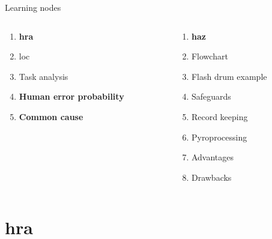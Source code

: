 \documentclass[aspectratio=1610,pdftex,dvipsnames,compress,xcolor={dvipsnames}]{beamer}
\newcommand{\acf}{\acrfull} %
\newcommand{\acl}{\acrlong} %
\newcommand{\acs}{\acrshort} %
\begin{document}
\begin{frame}{Learning nodes}
    \begin{columns}[t]

        \begin{column}{0.50\textwidth}
            \begin{enumerate}[series=outerlist,topsep=0pt,itemsep=1pt,leftmargin=*,label=(\arabic*)]
                \item[]\textbf{\acl{hra}}
                \item[]\acs{loc}
                \item[]Task analysis
                    \vspace{0.25in}
                \item[]\textbf{Human error probability}
                    \vspace{0.25in}
                \item[]\textbf{Common cause}
            \end{enumerate}
        \end{column}

        \begin{column}{0.50\textwidth}
            \begin{enumerate}[series=outerlist,topsep=0pt,itemsep=1pt,leftmargin=*,label=(\arabic*)]
                \item[]\hfill\textbf{\acs{haz}}
                \item[]\hfill Flowchart
                \item[]\hfill Flash drum example  
                \item[]\hfill Safeguards  
                \item[]\hfill Record keeping
                \item[]\hfill Pyroprocessing 
                \item[]\hfill Advantages
                \item[]\hfill Drawbacks
            \end{enumerate}
        \end{column}

    \end{columns}
\end{frame}


\section{\acf{hra}}
\end{document}
